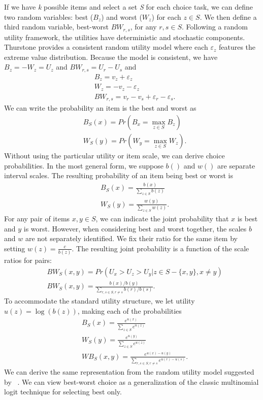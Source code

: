 \documentclass[a4paper,11pt]{article}
\begin{document}
If we have \emph{k} possible items and select a set \emph{S} for each choice task, we can define two random variables: best ($B_z$) and worst ($W_z$) for each $z \in S$.  We then define a third random variable, best-worst $BW_{r,s}$, for any $r,s \in S$. Following a random utility framework, the utilities have deterministic and stochastic components. Thurstone provides a consistent random utility model where each $\varepsilon_z$ features the extreme value distribution. Because the model is consistent, we have $B_z=-W_z=U_z$ and $BW_{r,s}=U_r-U_s$ and
\begin{align*}
&B_z=v_z+\varepsilon_z\\
&W_z=-v_z-\varepsilon_z\\
&BW_{r,s}=v_r-v_s+\varepsilon_r-\varepsilon_s.
\end{align*}We can write the probability an item is the best and worst as
\begin{align*}
&B_S (x)= Pr⁡( B_x=\max_{z \in S} B_z)\\
&W_S (y)= Pr⁡( W_y=\max_{z \in S} W_z).
\end{align*}
Without using the particular utility or item scale, we can derive choice probabilities. In the most general form, we suppose $b()$ and $w()$ are separate interval scales. The resulting probability of an item being best or worst is
\begin{align*}
&B_S (x)= \frac{b(x)}{\sum_{z \in S}b(z)}\\
&W_S (y)= \frac{w(y)}{\sum_{z \in S}w(z)}.
\end{align*}
For any pair of items $x,y \in S$, we can indicate the joint probability that $x$ is best and $y$ is worst. However, when considering best and worst together, the scales $b$ and $w$ are not separately identified. We fix their ratio for the same item by setting $w(z)=\frac{c}{b(z)}$. The resulting joint probability is a function of the scale ratios for pairs: 
\begin{align*}
&BW_S(x,y)=Pr(U_x>U_z>U_y | z \in S -\{x,y\}, x\neq y)\\
&BW_S(x,y)=\frac{b(x)/b(y)}{\sum_{r,s \in S, r \neq s}b(r)/b(s)}.
\end{align*}
To accommodate the standard utility structure, we let utility $u(z)=\log{(b(z))}$, making each of the probabilities 
\begin{align*}
&B_S(x)=\frac{e^{u(x)}}{\sum_{z \in S} e^{u(z)}}\\
&W_S(y)=\frac{e^{u(y)}}{\sum_{z \in S} e^{u(z)}}\\
&WB_S(x,y)=\frac{e^{u(x)-u(y)}}{\sum_{r,s \in S, r\neq s} e^{u(r)-u(s)}}.
\end{align*}
We can derive the same representation from the random utility model suggested by ~\cite{marley2005some}. We can view best-worst choice as a generalization of the classic multinomial logit technique for selecting best only.
\end{document}
